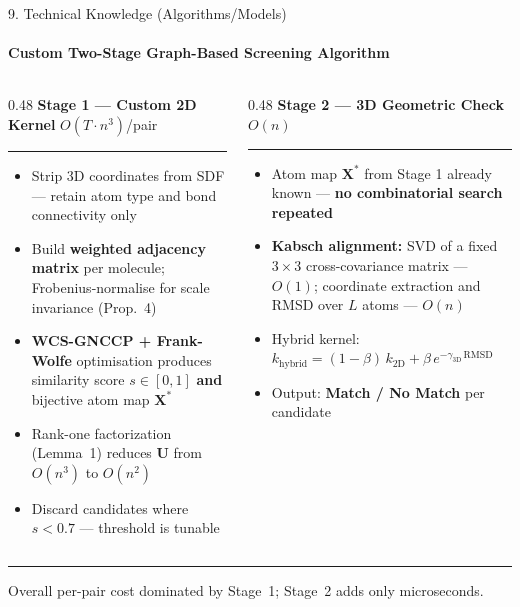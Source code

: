 \documentclass[aspectratio=169, 11pt]{beamer}
\begin{document}
\begin{frame}{9. Technical Knowledge (Algorithms/Models)}
\framesubtitle{Custom Two-Stage Graph-Based Screening Algorithm}

\begin{columns}[T]

    \begin{column}{0.48\textwidth}
        \textbf{Stage 1 --- Custom 2D Kernel} \hfill \textcolor{amritaMaroon}{\small $O(T \cdot n^3)$/pair}
        \vspace{0.3em}
        \hrule
        \vspace{0.4em}
        \begin{itemize}
            \setlength\itemsep{0.5em}
            \item Strip 3D coordinates from SDF --- retain atom type and bond connectivity only
            \item Build \textbf{weighted adjacency matrix} per molecule; Frobenius-normalise for scale invariance (Prop.~4)
            \item \textbf{WCS-GNCCP + Frank-Wolfe} optimisation produces similarity score $s \in [0,1]$ \textbf{and} bijective atom map $\mathbf{X}^*$
            \item Rank-one factorization (Lemma~1) reduces $\mathbf{U}$ from $O(n^3)$ to $O(n^2)$
            \item Discard candidates where $s < 0.7$ --- threshold is tunable
        \end{itemize}
    \end{column}

    \hfill\vrule\hfill

    \begin{column}{0.48\textwidth}
        \textbf{Stage 2 --- 3D Geometric Check} \hfill \textcolor{amritaMaroon}{\small $O(n)$}
        \vspace{0.3em}
        \hrule
        \vspace{0.4em}
        \begin{itemize}
            \setlength\itemsep{0.5em}
            \item Atom map $\mathbf{X}^*$ from Stage 1 already known --- \textbf{no combinatorial search repeated}
            \item \textbf{Kabsch alignment:} SVD of a fixed $3\times 3$ cross-covariance matrix --- $O(1)$; coordinate extraction and RMSD over $L$ atoms --- $O(n)$
            \item Hybrid kernel: $k_{\text{hybrid}} = (1{-}\beta)\,k_{\text{2D}} + \beta\,e^{-\gamma_{\text{3D}}\,\text{RMSD}}$
            \item Output: \textbf{Match / No Match} per candidate
        \end{itemize}
    \end{column}

\end{columns}

\vspace{0.4em}
\hrule
\vspace{0.2em}
\centering\small
Overall per-pair cost dominated by Stage~1; Stage~2 adds only microseconds.

\end{frame}
\end{document}
